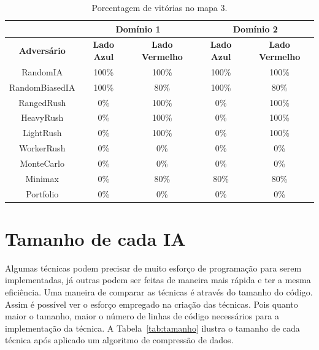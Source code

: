 \begin{table}[ht]
	\centering
	\caption{Porcentagem de vitórias no mapa 3.}
	\label{tab:mapa3}
	\begin{tabular}{|c|cc|cc|}
		\hline
		\textbf{}           & \multicolumn{2}{c|}{\textbf{Domínio 1}}  & \multicolumn{2}{c|}{\textbf{Domínio 2}}  \\ \hline
		\textbf{Adversário} & \textbf{Lado Azul} & \textbf{Lado Vermelho} & \textbf{Lado Azul} & \textbf{Lado Vermelho} \\ \hline
		RandomIA            & 100\%              & 100\%                  & 100\%              & 100\%                  \\ \hline
		RandomBiasedIA      & 100\%              & 80\%                   & 100\%              & 80\%                   \\ \hline
		RangedRush          & 0\%                & 100\%                  & 0\%                & 100\%                  \\ \hline
		HeavyRush           & 0\%                & 100\%                  & 0\%                & 100\%                  \\ \hline
		LightRush           & 0\%                & 100\%                  & 0\%                & 100\%                  \\ \hline
		WorkerRush          & 0\%                & 0\%                    & 0\%                & 0\%                    \\ \hline
		MonteCarlo          & 0\%                & 0\%                    & 0\%                & 0\%                    \\ \hline
		Minimax             & 0\%                & 80\%                  & 80\%              & 80\%                   \\ \hline
		Portfolio           & 0\%                & 0\%                    & 0\%                & 0\%                    \\ \hline
	\end{tabular}
\end{table}


\section{Tamanho de cada IA}

Algumas técnicas podem precisar de muito esforço de programação para serem implementadas, já outras podem ser feitas de maneira mais rápida e ter a mesma eficiência.
Uma maneira de comparar as técnicas é através do tamanho do código.
Assim é possível ver o esforço empregado na criação das técnicas.
Pois quanto maior o tamanho, maior o número de linhas de código necessários para a implementação da técnica.
A Tabela~\ref{tab:tamanho} ilustra o tamanho de cada técnica após aplicado um algoritmo de compressão de dados.

